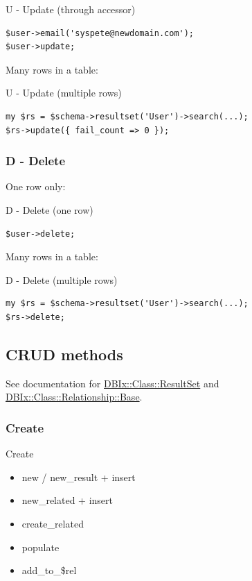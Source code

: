 \begin{frame}[fragile]{U - Update (through accessor)}
\begin{lstlisting}
$user->email('syspete@newdomain.com');
$user->update;
\end{lstlisting}
\end{frame}

Many rows in a table:

\begin{frame}[fragile]{U - Update (multiple rows)}
\begin{lstlisting}
my $rs = $schema->resultset('User')->search(...);
$rs->update({ fail_count => 0 });
\end{lstlisting}
\end{frame}

\subsubsection{D - Delete}

One row only:

\begin{frame}[fragile]{D - Delete (one row)}
\begin{lstlisting}
$user->delete;
\end{lstlisting}
\end{frame}

Many rows in a table:

\begin{frame}[fragile]{D - Delete (multiple rows)}
\begin{lstlisting}
my $rs = $schema->resultset('User')->search(...);
$rs->delete;
\end{lstlisting}
\end{frame}

\subsection{CRUD methods}

See documentation for 
\href{https://metacpan.org/pod/DBIx::Class::ResultSet}{DBIx::Class::ResultSet} 
and \href{https://metacpan.org/pod/DBIx::Class::Relationship::Base}
{DBIx::Class::Relationship::Base}.

\subsubsection{Create}

\begin{frame}{Create}
\begin{itemize}
\item new / new\_result + insert
\item new\_related + insert
\item create\_related
\item populate
\item add\_to\_\$rel
\end{itemize}
\end{frame}

